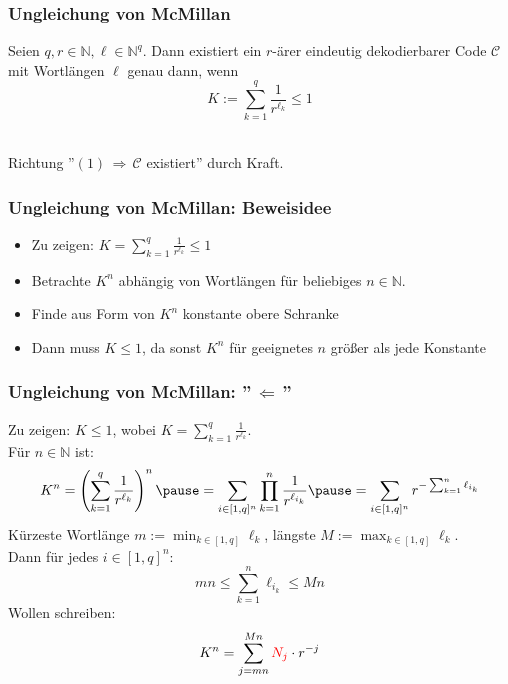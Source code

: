 \documentclass{beamer}
\begin{document}
\begin{frame}[t]
    \frametitle{Ungleichung von McMillan}
    Seien $q,r \in \mathbb{N}, \ell \in \mathbb{N}^q$. Dann existiert ein $r$-ärer eindeutig dekodierbarer Code $\mathcal{C}$
    mit Wortlängen $\ell$ genau dann, wenn
    \begin{equation}
        K := \sum_{k=1}^{q} \frac{1}{r^{\ell_k}} \leq 1
    \end{equation}\\[20pt]
    \pause

    Richtung ''$(1) \,\Longrightarrow\, \mathcal{C}$ existiert'' durch Kraft.\\
\end{frame}

\begin{frame}[t]
    \frametitle{Ungleichung von McMillan: Beweisidee}
    \begin{itemize}
        \setlength\itemsep{1.3em}
        \item Zu zeigen: $K = \sum_{k=1}^{q} \frac{1}{r^{\ell_k}} \leq 1$
        \item Betrachte $K^n$ abhängig von Wortlängen für beliebiges $n \in \mathbb{N}$.
        \item Finde aus Form von $K^n$ konstante obere Schranke
        \item Dann muss $K \leq 1$, da sonst $K^n$ für geeignetes $n$ größer
            als jede Konstante
    \end{itemize}
\end{frame}

\begin{frame}[t]
    \frametitle{Ungleichung von McMillan: ''$\,\Longleftarrow\,$''}
        Zu zeigen: $K \leq 1$, wobei
        $\displaystyle
            K = \sum_{k=1}^{q} \frac{1}{r^{\ell_k}}
        $.\\
        \pause
        Für $n \in \mathbb{N}$ ist:
        $$
            K^n = \left(\sum_{k=1}^{q} \frac{1}{r^{\ell_k}}\right)^n
            \pause
            = \sum_{i \in [1,q]^n} \prod_{k=1}^{n} \frac{1}{r^{\ell_{i_k}}}
            \pause
            = \sum_{i\in [1,q]^n} r^{-\sum_{k=1}^{n} \ell_{i_k}}
        $$\pause
        Kürzeste Wortlänge $\displaystyle m := \min_{k \in [1,q]} \ell_k$,
        längste $\displaystyle M := \max_{k \in [1,q]} \ell_k$.\\\pause
        Dann für jedes $i \in [1,q]^n:$
        $$
            mn \leq \sum_{k=1}^{n} \ell_{i_k} \leq Mn
        $$
        \pause
        Wollen schreiben:
        $$
            K^n = \sum_{j=mn}^{Mn} {\color{red}N_j}\cdot r^{-j}
        $$
\end{frame}
\end{document}
